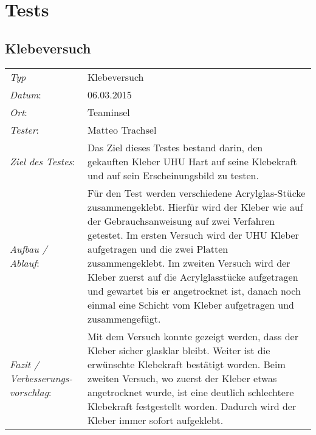 \section{Tests}
\subsection{Klebeversuch}
\begin{tabular}{p{3.6cm}p{\textwidth-3.6cm-0.7cm}}
    \rule{0pt}{11pt}\textit{Typ}              & Klebeversuch \\ 
    \rule{0pt}{11pt}\textit{Datum}:           & 06.03.2015   \\
    \rule{0pt}{11pt}\textit{Ort}:             & Teaminsel \\
    \rule{0pt}{11pt}\textit{Tester}:          & Matteo Trachsel \\
    \rule{0pt}{11pt}\textit{Ziel des Testes}: & Das Ziel dieses Testes bestand darin, den 
    gekauften Kleber UHU Hart auf seine Klebekraft und auf sein Erscheinungsbild zu testen. \\
    \rule{0pt}{11pt}\textit{Aufbau / Ablauf}: & 
    Für den Test werden verschiedene Acrylglas-Stücke zusammengeklebt.
    Hierfür wird der Kleber wie auf der Gebrauchsanweisung auf zwei Verfahren getestet. 
    Im ersten Versuch wird der UHU Kleber aufgetragen und die zwei Platten zusammengeklebt. 
    Im zweiten Versuch wird der Kleber zuerst auf die Acrylglasstücke aufgetragen und 
    gewartet bis er angetrocknet ist, danach noch einmal eine Schicht vom Kleber aufgetragen 
    und zusammengefügt.\\
    \rule{0pt}{11pt}\textit{Fazit / Verbesserungs-\newline vorschlag}: & 
    Mit dem Versuch konnte gezeigt werden, dass der Kleber sicher glasklar bleibt. Weiter 
    ist die erwünschte Klebekraft bestätigt worden. Beim zweiten Versuch, wo zuerst der 
    Kleber etwas angetrocknet wurde, ist eine deutlich schlechtere Klebekraft festgestellt 
    worden. Dadurch wird der Kleber immer sofort aufgeklebt.\\
\end{tabular}
